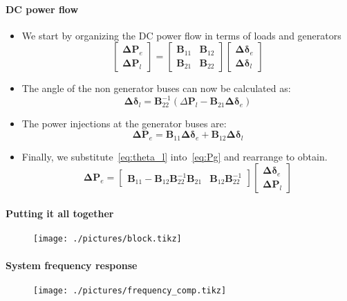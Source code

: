 \begin{frame}{\secname}
	\framesubtitle{DC power flow}
	\begin{itemize}
		\item We start by organizing the DC power flow in terms of loads and generators
		\begin{equation}
			\begin{bmatrix}
				\boldsymbol{\Delta P}_{e} \\ \boldsymbol{\Delta P}_{l}
			\end{bmatrix}
			=
			\begin{bmatrix}
				\boldsymbol{B}_{11} & \boldsymbol{B}_{12} \\
				\boldsymbol{B}_{21} & \boldsymbol{B}_{22}
			\end{bmatrix}
			\begin{bmatrix}
				\boldsymbol{\Delta \delta}_e \\
				\boldsymbol{\Delta \delta}_l
			\end{bmatrix}
		\end{equation}
		\item The angle of the non generator buses can now be calculated as:
			\begin{equation}\label{eq:theta_l}
				\boldsymbol{\Delta\delta}_l = \boldsymbol{B}_{22}^{-1}(\Delta\boldsymbol{P}_l - \boldsymbol{B}_{21}\boldsymbol{\Delta\delta}_e)
			\end{equation}
		\item The power injections at the generator buses are:
			\begin{equation}\label{eq:Pg}
				\boldsymbol{\Delta P}_e = \boldsymbol{B}_{11} \boldsymbol{\Delta\delta}_e + \boldsymbol{B}_{12}\boldsymbol{\Delta\delta}_l
			\end{equation}
		\item Finally, we substitute~\eqref{eq:theta_l} into~\eqref{eq:Pg} and rearrange to obtain.
\begin{equation}\label{eq:DC}
	\boldsymbol{\Delta P}_e = 
	\begin{bmatrix}
			\boldsymbol{B}_{11}-\boldsymbol{B}_{12}\boldsymbol{B}_{22}^{-1}\boldsymbol{B}_{21} & \boldsymbol{B}_{12}\boldsymbol{B}^{-1}_{22}
	\end{bmatrix}
	\begin{bmatrix}
		\boldsymbol{\Delta\delta}_e \\
		\boldsymbol{\Delta P}_l
	\end{bmatrix}
\end{equation}
	\end{itemize}
\end{frame}
\begin{frame}{\secname}
	\framesubtitle{Putting it all together}
	\begin{figure}
		\texttt{[image: ./pictures/block.tikz]}
	\end{figure}
\end{frame}
\begin{frame}{\secname}
	\framesubtitle{System frequency response}
	\begin{figure}[t]
			\texttt{[image: ./pictures/frequency\_comp.tikz]}
	\end{figure}
\end{frame}
